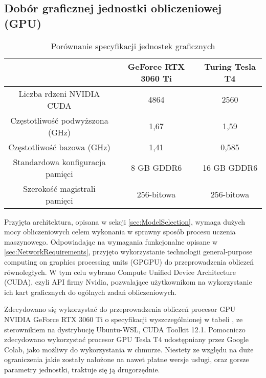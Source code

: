 \subsection{Dobór graficznej jednostki obliczeniowej (GPU)}
\label{sec:GPUSelection}
\begin{table}[H]
    \centering
    \caption{ Porównanie specyfikacji jednostek graficznych}
    \begin{tabular}{c|c|c}
    & GeForce RTX 3060 Ti\footnotemark[1] & Turing Tesla T4\footnotemark[2]\\
    \hline
    Liczba rdzeni NVIDIA CUDA & 4864 & 2560  \\
    \hline
    Częstotliwość podwyższona (GHz) & 1,67 &  1,59\\
    \hline
    Częstotliwość bazowa (GHz) & 1,41  & 0,585\\
    \hline
    Standardowa konfiguracja pamięci & 8 GB GDDR6 & 16 GB GDDR6  \\
    \hline
    Szerokość magistrali pamięci & 256-bitowa  & 256-bitowa\\
    \end{tabular}
    \label{tab:RTX3060TiSpecification}
\end{table}
\par 
Przyjęta architektura, opisana w sekcji \ref{sec:ModelSelection}, wymaga dużych mocy obliczeniowych celem wykonania w sprawny sposób procesu uczenia maszynowego. Odpowiadając na wymagania funkcjonalne opisane w \ref{sec:NetworkRequirements}, przyjęto wykorzystanie technologii general-purpose computing on graphics processing units (GPGPU) do przeprowadzenia obliczeń równoległych. W tym celu wybrano Compute Unified Device Architecture (CUDA), czyli API firmy Nvidia, pozwalające użytkownikom na wykorzystanie ich kart graficznych do ogólnych zadań obliczeniowych. 
\par
Zdecydowano się wykorzystać do przeprowadzenia obliczeń procesor GPU NVIDIA GeForce RTX 3060 Ti o specyfikacji wyszczególnionej w tabeli , ze sterownikiem na dystrybucję Ubuntu-WSL, CUDA Toolkit 12.1. 
Pomocniczo zdecydowano wykorzystać procesor GPU Tesla T4 udostępniany przez Google Colab, jako możliwy do wykorzystania w chmurze. Niestety ze względu na duże ograniczenia jakie zostały nałożone na nawet płatne wersje usługi, oraz gorsze parametry jednostki, traktuje się ją drugorzędnie.




